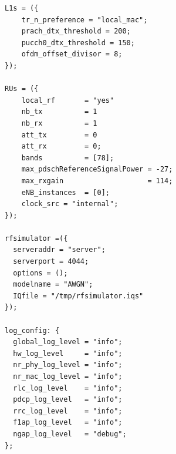 \begin{lstlisting}[style=confstyle, caption=DU1 band78 PCI 1 Configuration]
L1s = ({
    tr_n_preference = "local_mac";
    prach_dtx_threshold = 200;
    pucch0_dtx_threshold = 150;
    ofdm_offset_divisor = 8;
});

RUs = ({
    local_rf       = "yes"
    nb_tx          = 1
    nb_rx          = 1
    att_tx         = 0
    att_rx         = 0;
    bands          = [78];
    max_pdschReferenceSignalPower = -27;
    max_rxgain                    = 114;
    eNB_instances  = [0];
    clock_src = "internal";
});

rfsimulator =({
  serveraddr = "server";
  serverport = 4044;
  options = ();
  modelname = "AWGN";
  IQfile = "/tmp/rfsimulator.iqs"
});

log_config: {
  global_log_level = "info";
  hw_log_level     = "info";
  nr_phy_log_level = "info";
  nr_mac_log_level = "info";
  rlc_log_level    = "info";
  pdcp_log_level   = "info";
  rrc_log_level    = "info";
  f1ap_log_level   = "info";
  ngap_log_level   = "debug";
};
\end{lstlisting}